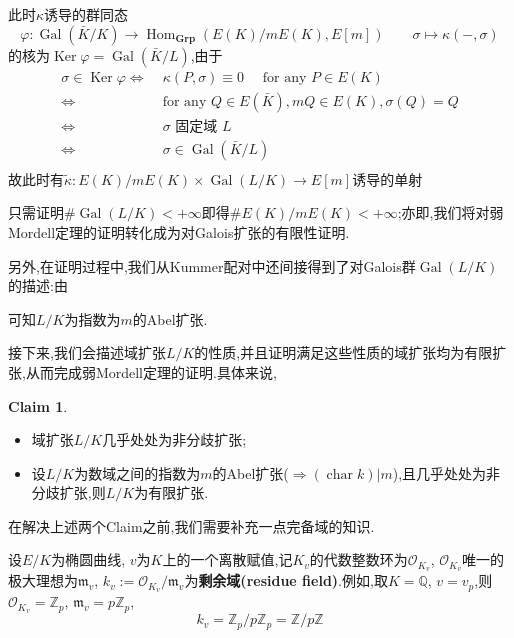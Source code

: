 \documentclass[12pt,A4paper,oneside,reqno]{amsart}
\numberwithin{equation}{section}
\theoremstyle{definition}
\newtheorem{claim}[theorem]{Claim}
\theoremstyle{plain}
\theoremstyle{plain}
\numberwithin{equation}{section}
\theoremstyle{remark}
\DeclareMathOperator{\cha}{\operatorname{char}}
\DeclareMathOperator{\Ker}{\operatorname{Ker}}
\newcommand{\Hom}{\operatorname{Hom}}
\newcommand{\Gal}{\operatorname{Gal}}
\newcommand{\Grp}{\operatorname{\textbf{Grp}}}
\begin{document}
此时$\kappa$诱导的群同态
$$\varphi:\Gal(\bar{K}/K)\longrightarrow \Hom_{\Grp}(E(K)/mE(K),E[m]) \qquad \sigma \longmapsto \kappa(-,\sigma)$$
的核为$\Ker \varphi=\Gal(\bar{K}/L)$,由于
\begin{equation*}
\begin{aligned}
\sigma \in \Ker \varphi \Longleftrightarrow\; & \kappa(P,\sigma)\equiv 0 \quad\text{ for any } P \in E(K)\\
\Longleftrightarrow\; & \text{for any }Q \in E(\bar{K}),mQ \in E(K), \sigma(Q)=Q\\
\Longleftrightarrow\; & \sigma\text{ 固定域 }L\\
\Longleftrightarrow\; & \sigma \in \Gal(\bar{K}/L)\\
\end{aligned}
\end{equation*}
故此时有$\tilde{\kappa}:E(K)/mE(K) \times \Gal (L/K) \longrightarrow E[m]$诱导的单射
	\begin{center}
	\end{center}
只需证明$\#\Gal(L/K) < +\infty$即得$\#E(K)/mE(K) < + \infty$;亦即,我们将对弱Mordell定理的证明转化成为对Galois扩张的有限性证明.

另外,在证明过程中,我们从Kummer配对中还间接得到了对Galois群$\Gal(L/K)$的描述:由
	\begin{center}
\end{center}
可知$L/K$为指数为$m$的Abel扩张.

接下来,我们会描述域扩张$L/K$的性质,并且证明满足这些性质的域扩张均为有限扩张,从而完成弱Mordell定理的证明.具体来说,
\begin{claim}\label{claim:finite}\
\begin{itemize}
	\item 域扩张$L/K$几乎处处为非分歧扩张;
	\item 设$L/K$为数域之间的指数为$m$的Abel扩张($\Rightarrow (\cha  k) |m$),且几乎处处为非分歧扩张,则$L/K$为有限扩张.
\end{itemize}
\end{claim}
在解决上述两个Claim之前,我们需要补充一点完备域的知识.

	设$E/K$为椭圆曲线, $v$为$K$上的一个离散赋值,记$K_v$的代数整数环为$\mathcal{O}_{K_v}$, $\mathcal{O}_{K_v}$唯一的极大理想为$\mathfrak{m}_v$, $k_v:=\mathcal{O}_{K_v}/\mathfrak{m}_v$为\textbf{剩余域(residue field)}.例如,取$K=\mathbb{Q}$, $v=v_p$,则$\mathcal{O}_{K_v}=\mathbb{Z}_p$, $\mathfrak{m}_v=p\mathbb{Z}_p$,
	$$k_v=\mathbb{Z}_p/p\mathbb{Z}_p=\mathbb{Z}/p\mathbb{Z}$$
	
\end{document}
